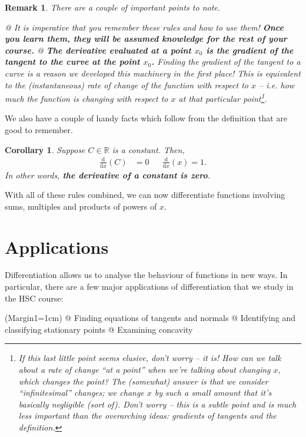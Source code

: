 \documentclass[a4paper,11pt]{article}
\newcommand{\R}{\mathbb{R}}
\newcommand{\diff}[2]{\frac{\mathrm{d}#1}{\mathrm{d}#2}}
\newtheorem*{corollary*}{Corollary}
\newtheorem*{remark}{Remark}
\begin{document}
	
	\begin{remark}
		\normalfont
		There are a couple of important points to note.
		\begin{easylist}[itemize]
			@ It is imperative that you remember these rules and how to use them! \textbf{Once you learn them, they will be assumed knowledge for the rest of your course.}
			@ \textbf{The derivative evaluated at a point $x_0$ is the gradient of the tangent to the curve at the point $x_0$.} Finding the gradient of the tangent to a curve is a reason we developed this machinery in the first place! This is equivalent to the (instantaneous) rate of change of the function with respect to $x$ -- i.e. how much the function is changing with respect to $x$ at that particular point\footnote{If this last little point seems elusive, don't worry -- it is! How can we talk about a rate of change ``at a point'' when we're talking about changing $x$, which changes the point? The (somewhat) answer is that we consider ``infinitesimal'' changes; we change $x$ by such a small amount that it's basically negligible (sort of). Don't worry -- this is a subtle point and is much less important than the overarching ideas: gradients of tangents and the definition.}.
		\end{easylist}
	\end{remark}

	\noindent We also have a couple of handy facts which follow from the definition that are good to remember.
	\begin{corollary*}
		Suppose $C\in\R$ is a constant. Then,
		\begin{align*}
		\diff{}{x}\left(C\right) &= 0 && \diff{}{x}\left(x\right) = 1.
		\end{align*}
		In other words, \textbf{the derivative of a constant is zero}.
	\end{corollary*}
	\noindent With all of these rules combined, we can now differentiate functions involving sums, multiples and products of powers of $x$.
	
	\section{Applications}
	Differentiation allows us to analyse the behaviour of functions in new ways. In particular, there are a few major applications of differentiation that we study in the HSC course:
	\vspace{0.15cm}
	\begin{easylist}[itemize]
		\ListProperties(Margin1=1cm)
		@ Finding equations of tangents and normals
		@ Identifying and classifying stationary points
		@ Examining concavity
	\end{easylist}
\end{document}
